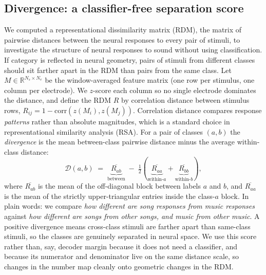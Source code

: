 \documentclass[11pt]{article}
\newcommand{\divg}{\mathcal{D}}
\begin{document}
\subsection{Divergence: a classifier-free separation score}\label{sec:methods:divergence}
We computed a representational dissimilarity matrix (RDM), the matrix of pairwise distances between the neural responses to every pair of stimuli, to investigate the structure of neural responses to sound without using classification. If category is reflected in neural geometry, pairs of stimuli from different classes should sit farther apart in the RDM than pairs from the same class. Let $M \in \mathbb{R}^{N_s \times N_e}$ be the window-averaged feature matrix (one row per stimulus, one column per electrode). We $z$-score each column so no single electrode dominates the distance, and define the RDM $R$ by correlation distance between stimulus rows, $R_{ij} = 1 - \mathrm{corr}(z(M_i), z(M_j))$. Correlation distance compares response \emph{patterns} rather than absolute magnitudes, which is a standard choice in representational similarity analysis (RSA). For a pair of classes $(a, b)$ the \emph{divergence} is the mean between-class pairwise distance minus the average within-class distance:
\begin{equation}
  \divg(a, b) \;=\; \underbrace{\overline{R_{ab}}}_{\text{between}} \;-\; \tfrac{1}{2}\!\left(\underbrace{\overline{R_{aa}}}_{\text{within-}a} + \underbrace{\overline{R_{bb}}}_{\text{within-}b}\right),
\label{eq:divergence}
\end{equation}
where $\overline{R_{ab}}$ is the mean of the off-diagonal block between labels $a$ and $b$, and $\overline{R_{aa}}$ is the mean of the strictly upper-triangular entries inside the class-$a$ block. In plain words: we compare \emph{how different are song responses from music responses} against \emph{how different are songs from other songs, and music from other music}. A positive divergence means cross-class stimuli are farther apart than same-class stimuli, so the classes are genuinely separated in neural space. We use this score rather than, say, decoder margin because it does not need a classifier, and because its numerator and denominator live on the same distance scale, so changes in the number map cleanly onto geometric changes in the RDM.
\end{document}
